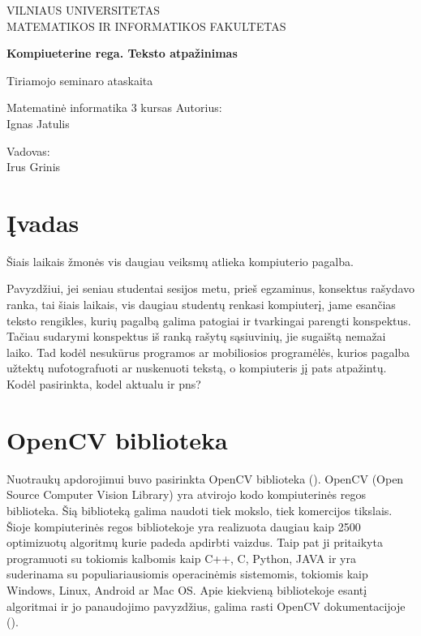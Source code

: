 \documentclass[a4paper,12pt]{article}
\begin{document}
\begin{titlepage}
	\centering
	{\scshape\large VILNIAUS UNIVERSITETAS \\
	MATEMATIKOS IR INFORMATIKOS FAKULTETAS \par}
	\vspace{6cm}
	{\huge\bfseries Kompiueterine rega. Teksto atpažinimas\par}
	{\LARGE Tiriamojo seminaro ataskaita\par}
	{\Large Matematinė informatika 3 kursas}
	\vspace{3cm}
	\vfill
	\flushright
	Autorius: \\ Ignas Jatulis\par
	\vspace{0.5cm}
	Vadovas: \\ Irus Grinis
	\vfill
	\centering
	{\the\year}
\end{titlepage}	
\tableofcontents

\newpage
\section*{Įvadas}

Šiais laikais žmonės vis daugiau veiksmų atlieka kompiuterio pagalba. 

Pavyzdžiui, jei seniau studentai sesijos metu, prieš egzaminus, konsektus rašydavo ranka, tai šiais laikais, vis daugiau studentų renkasi kompiuterį, jame esančias teksto rengikles, kurių pagalbą galima patogiai ir tvarkingai parengti konspektus. Tačiau sudarymi konspektus iš ranką rašytų sąsiuvinių, jie sugaištą nemažai laiko.  Tad kodėl nesukūrus programos ar mobiliosios programėlės, kurios pagalba užtektų nufotografuoti ar nuskenuoti tekstą, o kompiuteris jį pats atpažintų. 
Kodėl pasirinkta, kodel aktualu ir pns?

\newpage
\section{OpenCV biblioteka}
Nuotraukų apdorojimui buvo pasirinkta OpenCV biblioteka  (\cite{OpenCVabout}). OpenCV (Open Source Computer Vision Library) yra atvirojo kodo kompiuterinės regos biblioteka. Šią biblioteką galima naudoti tiek mokslo, tiek komercijos tikslais.\\
\indent Šioje kompiuterinės regos bibliotekoje yra realizuota daugiau kaip 2500 optimizuotų algoritmų kurie padeda apdirbti vaizdus. Taip pat ji pritaikyta programuoti su tokiomis kalbomis kaip C++, C, Python, JAVA ir yra suderinama su populiariausiomis operacinėmis sistemomis, tokiomis kaip Windows, Linux, Android ar Mac OS. Apie kiekvieną bibliotekoje esantį algoritmai ir jo panaudojimo pavyzdžius, galima rasti OpenCV dokumentacijoje  (\cite{OpenCVdoc}).
\end{document}
